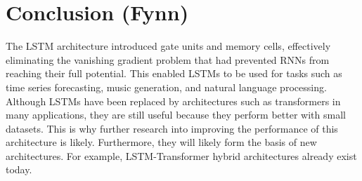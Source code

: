 \documentclass[twoside,a4paper,10pt,DIV=12,BCOR=12mm]{scrartcl}
\begin{document}
\section{Conclusion (Fynn)}
The LSTM architecture introduced gate units and memory cells, effectively eliminating the vanishing gradient problem that had prevented RNNs from reaching their full potential.\cite{hochreiter1997lstm} 
This enabled LSTMs to be used for tasks such as time series forecasting, music generation, and natural language processing.\cite{eck2002musicgeneration,nielsen2024electricitypriceforcasting,gers2001timeseries,torres2022elctricityforecasting,sak2014longshorttermmemorybased}\\
Although LSTMs have been replaced by architectures such as transformers in many applications, they are still useful because they perform better with small datasets. This is why further research into improving the performance of this architecture is likely.\cite{alselwi2024lstmfuture} Furthermore, they will likely form the basis of new architectures. For example, LSTM-Transformer hybrid architectures already exist today. \cite{zhao2025lstmtransformerhybrid} 



\end{document}
